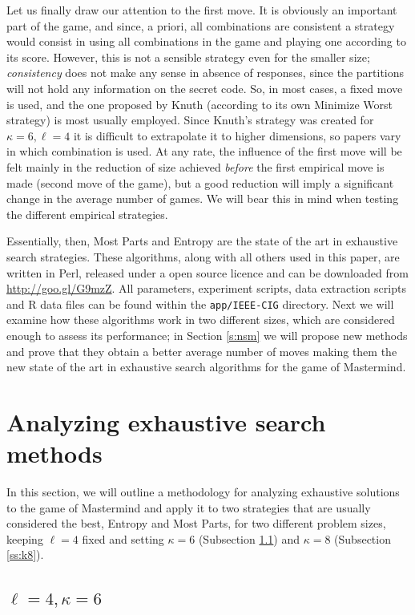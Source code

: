 \documentclass[preprint,12pt]{elsarticle}
\begin{document}
Let us finally draw our attention to the first move. It is obviously
an important part of the game, and since, a priori, all combinations
are consistent a strategy would consist in using all combinations in
the game and playing one according to its score. However, this is not
a sensible strategy even for the smaller size; {\em consistency} does
not make any sense in absence of responses, since the partitions will
not hold any information on the secret code. So, in most cases, a
fixed move is used, and the one proposed by Knuth (according to its
own Minimize Worst strategy) is most usually employed. Since Knuth's
strategy \cite{Knuth} was created for $\kappa=6, \ell=4$ it is
difficult to extrapolate it to higher dimensions, so papers vary in
which combination is used. At any rate, the influence of the first
move will be felt mainly in the reduction of size achieved {\em
  before} the first empirical move is made (second move of the game),
but a good reduction will imply a significant change in the average
number of games. We will bear this in mind when testing the different
empirical strategies. 

Essentially, then, Most Parts and Entropy are the state of the art in
exhaustive search strategies. These algorithms, along with all others
used in this paper, are written in Perl, released under a open source
licence and can be downloaded from \url{http://goo.gl/G9mzZ}. All
parameters, experiment scripts, data extraction scripts and R data
files can be found within the {\tt app/IEEE-CIG} directory. Next we
will examine how these algorithms work in two different sizes, which
are considered enough to assess its performance; in
Section \ref{s:nsm} we will propose new methods and prove that they
obtain a better average number of moves making them the new state of
the art in exhaustive search algorithms for the game of Mastermind. 

\section{Analyzing exhaustive search methods}
\label{s:sm}

In this section, we will outline a methodology for analyzing
exhaustive solutions to the game of Mastermind and apply it to two
strategies that are usually considered the best, Entropy and Most
Parts, for two different problem sizes, keeping  $\ell=4$ fixed and
setting $\kappa=6$ (Subsection \ref{ss:k6}) and  $\kappa=8$
(Subsection \ref{ss:k8}).

\subsection{$\ell=4,\kappa=6$}
\label{ss:k6}
\end{document}
